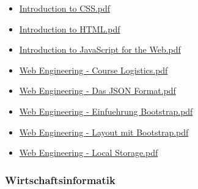 \documentclass[
  letterpaper,
  DIV=11]{scrartcl}
\providecommand{\tightlist}{%
  \setlength{\itemsep}{0pt}\setlength{\parskip}{0pt}}\usepackage{longtable,booktabs,array}
\begin{document}
\begin{itemize}
\tightlist
\item
  \href{google_slides/web_engineering/Introduction\%20to\%20CSS.pdf}{Introduction
  to CSS.pdf}
\item
  \href{google_slides/web_engineering/Introduction\%20to\%20HTML.pdf}{Introduction
  to HTML.pdf}
\item
  \href{google_slides/web_engineering/Introduction\%20to\%20JavaScript\%20for\%20the\%20Web.pdf}{Introduction
  to JavaScript for the Web.pdf}
\item
  \href{google_slides/web_engineering/Web\%20Engineering\%20-\%20Course\%20Logistics.pdf}{Web
  Engineering - Course Logistics.pdf}
\item
  \href{google_slides/web_engineering/Web\%20Engineering\%20-\%20Das\%20JSON\%20Format.pdf}{Web
  Engineering - Das JSON Format.pdf}
\item
  \href{google_slides/web_engineering/Web\%20Engineering\%20-\%20Einfuehrung\%20Bootstrap.pdf}{Web
  Engineering - Einfuehrung Bootstrap.pdf}
\item
  \href{google_slides/web_engineering/Web\%20Engineering\%20-\%20Layout\%20mit\%20Bootstrap.pdf}{Web
  Engineering - Layout mit Bootstrap.pdf}
\item
  \href{google_slides/web_engineering/Web\%20Engineering\%20-\%20Local\%20Storage.pdf}{Web
  Engineering - Local Storage.pdf}
\end{itemize}

\subsubsection{Wirtschaftsinformatik}\label{wirtschaftsinformatik}
\end{document}
